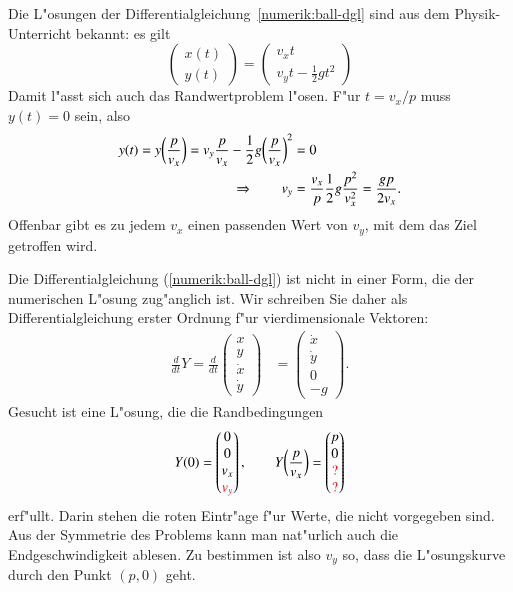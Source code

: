Die L"osungen der Differentialgleichung~\ref{numerik:ball-dgl} sind aus
dem Physik-Unterricht bekannt:
es gilt
\begin{equation}
\begin{pmatrix}x(t)\\y(t)\end{pmatrix}
=
\begin{pmatrix}v_xt\\ v_yt-\frac12gt^2\end{pmatrix}
\end{equation}
Damit l"asst sich auch das Randwertproblem l"osen.
F"ur $t=v_x/p$ muss $y(t)=0$ sein, also
\begin{align}
y(t)=y\biggl(\frac{p}{v_x}\biggr)
=v_y\frac{p}{v_x}-\frac12g\biggl(\frac{p}{v_x}\biggr)^2&=0
\notag
\\
\Rightarrow\qquad
v_y
&=
\frac{v_x}p\frac12g\frac{p^2}{v_x^2}=\frac{gp}{2v_x}.
\label{numerik:ball-bedingung}
\end{align}
Offenbar gibt es zu jedem $v_x$ einen passenden Wert von $v_y$,
mit dem das Ziel getroffen wird.

Die Differentialgleichung (\ref{numerik:ball-dgl}) ist nicht in einer
Form, die der numerischen L"osung zug"anglich ist.
Wir schreiben Sie daher als Differentialgleichung erster Ordnung 
f"ur vierdimensionale Vektoren:
\begin{align}
\frac{d}{dt}Y
=
\frac{d}{dt}\begin{pmatrix}x\\y\\\dot x\\\dot y\end{pmatrix}
&=
\begin{pmatrix}\dot x\\\dot y\\ 0\\ -g\end{pmatrix}.
\label{numerik:ball-dgl-1}
\end{align}
Gesucht ist eine L"osung, die die Randbedingungen
\begin{equation}
Y(0)
=
\begin{pmatrix}0\\0\\v_x\\\color{red}v_y\end{pmatrix},
\qquad
Y\biggl(\frac{p}{v_x}\biggr)
=
\begin{pmatrix}p\\0\\\color{red}?\\\color{red}?\end{pmatrix}
\label{numerik:ball-dgl-2}
\end{equation}
erf"ullt.
Darin stehen die roten Eintr"age f"ur Werte, die nicht vorgegeben sind.
Aus der Symmetrie des Problems kann man nat"urlich auch die Endgeschwindigkeit
ablesen.
Zu bestimmen ist also $v_y$ so, dass die L"osungskurve durch den Punkt
$(p,0)$ geht.

